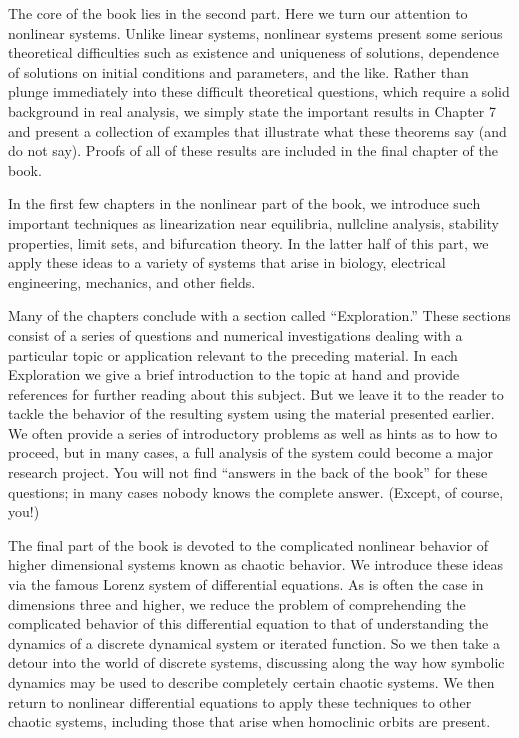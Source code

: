 \documentclass[12pt]{article}
\begin{document}
The core of the book lies in the second part. Here we turn our attention
to nonlinear systems. Unlike linear systems, nonlinear systems present
some serious theoretical difficulties such as existence and uniqueness of solutions,
dependence of solutions on initial conditions and parameters, and the
like. Rather than plunge immediately into these difficult theoretical questions,
which require a solid background in real analysis, we simply state the important
results in Chapter 7 and present a collection of examples that illustrate
what these theorems say (and do not say). Proofs of all of these results are
included in the final chapter of the book.

In the first few chapters in the nonlinear part of the book, we introduce
such important techniques as linearization near equilibria, nullcline analysis,
stability properties, limit sets, and bifurcation theory. In the latter half of this
part, we apply these ideas to a variety of systems that arise in biology, electrical
engineering, mechanics, and other fields.

Many of the chapters conclude with a section called “Exploration.” These
sections consist of a series of questions and numerical investigations dealing
with a particular topic or application relevant to the preceding material. In
each Exploration we give a brief introduction to the topic at hand and provide
references for further reading about this subject. But we leave it to the reader to
tackle the behavior of the resulting system using the material presented earlier.
We often provide a series of introductory problems as well as hints as to how
to proceed, but in many cases, a full analysis of the system could become a
major research project. You will not find “answers in the back of the book” for
these questions; in many cases nobody knows the complete answer. (Except,
of course, you!)

The final part of the book is devoted to the complicated nonlinear behavior
of higher dimensional systems known as chaotic behavior. We introduce these
ideas via the famous Lorenz system of differential equations. As is often the
case in dimensions three and higher, we reduce the problem of comprehending
the complicated behavior of this differential equation to that of understanding
the dynamics of a discrete dynamical system or iterated function. So we then
take a detour into the world of discrete systems, discussing along the way how
symbolic dynamics may be used to describe completely certain chaotic systems.
We then return to nonlinear differential equations to apply these techniques
to other chaotic systems, including those that arise when homoclinic orbits
are present.
\end{document}
